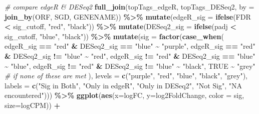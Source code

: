 \documentclass[
]{book}
\newenvironment{Shaded}{\begin{snugshade}}{\end{snugshade}}
\newcommand{\AttributeTok}[1]{\textcolor[rgb]{0.13,0.29,0.53}{#1}}
\newcommand{\CommentTok}[1]{\textcolor[rgb]{0.56,0.35,0.01}{\textit{#1}}}
\newcommand{\ConstantTok}[1]{\textcolor[rgb]{0.56,0.35,0.01}{#1}}
\newcommand{\FunctionTok}[1]{\textcolor[rgb]{0.13,0.29,0.53}{\textbf{#1}}}
\newcommand{\NormalTok}[1]{#1}
\newcommand{\SpecialCharTok}[1]{\textcolor[rgb]{0.81,0.36,0.00}{\textbf{#1}}}
\newcommand{\StringTok}[1]{\textcolor[rgb]{0.31,0.60,0.02}{#1}}
\begin{document}
\begin{Shaded}
\begin{Highlighting}[]
\CommentTok{\# compare edgeR \& DESeq2}
\FunctionTok{full\_join}\NormalTok{(topTags\_edgeR, topTags\_DESeq2,}
          \AttributeTok{by =} \FunctionTok{join\_by}\NormalTok{(ORF, SGD, GENENAME)) }\SpecialCharTok{\%\textgreater{}\%}
  \FunctionTok{mutate}\NormalTok{(}\AttributeTok{edgeR\_sig =} \FunctionTok{ifelse}\NormalTok{(FDR }\SpecialCharTok{\textless{}}\NormalTok{ sig\_cutoff, }\StringTok{"red"}\NormalTok{, }\StringTok{"black"}\NormalTok{)) }\SpecialCharTok{\%\textgreater{}\%}
  \FunctionTok{mutate}\NormalTok{(}\AttributeTok{DESeq2\_sig =} \FunctionTok{ifelse}\NormalTok{(padj }\SpecialCharTok{\textless{}}\NormalTok{ sig\_cutoff, }\StringTok{"blue"}\NormalTok{, }\StringTok{"black"}\NormalTok{)) }\SpecialCharTok{\%\textgreater{}\%} 
  \FunctionTok{mutate}\NormalTok{(}\AttributeTok{sig =} \FunctionTok{factor}\NormalTok{(}\FunctionTok{case\_when}\NormalTok{(}
\NormalTok{    edgeR\_sig }\SpecialCharTok{==} \StringTok{"red"} \SpecialCharTok{\&}\NormalTok{ DESeq2\_sig }\SpecialCharTok{==} \StringTok{"blue"} \SpecialCharTok{\textasciitilde{}} \StringTok{"purple"}\NormalTok{,}
\NormalTok{    edgeR\_sig }\SpecialCharTok{==} \StringTok{"red"} \SpecialCharTok{\&}\NormalTok{ DESeq2\_sig }\SpecialCharTok{!=} \StringTok{"blue"} \SpecialCharTok{\textasciitilde{}} \StringTok{"red"}\NormalTok{,}
\NormalTok{    edgeR\_sig }\SpecialCharTok{!=} \StringTok{"red"} \SpecialCharTok{\&}\NormalTok{ DESeq2\_sig }\SpecialCharTok{==} \StringTok{"blue"} \SpecialCharTok{\textasciitilde{}} \StringTok{"blue"}\NormalTok{,}
\NormalTok{    edgeR\_sig }\SpecialCharTok{!=} \StringTok{"red"} \SpecialCharTok{\&}\NormalTok{ DESeq2\_sig }\SpecialCharTok{!=} \StringTok{"blue"} \SpecialCharTok{\textasciitilde{}} \StringTok{"black"}\NormalTok{,}
    \ConstantTok{TRUE} \SpecialCharTok{\textasciitilde{}} \StringTok{"grey"}  \CommentTok{\# if none of these are met}
\NormalTok{  ), }\AttributeTok{levels =} \FunctionTok{c}\NormalTok{(}\StringTok{"purple"}\NormalTok{, }\StringTok{"red"}\NormalTok{, }\StringTok{"blue"}\NormalTok{, }\StringTok{"black"}\NormalTok{, }\StringTok{"grey"}\NormalTok{), }\AttributeTok{labels =} \FunctionTok{c}\NormalTok{(}\StringTok{"Sig in Both"}\NormalTok{, }\StringTok{"Only in edgeR"}\NormalTok{, }\StringTok{"Only in DESeq2"}\NormalTok{, }\StringTok{"Not Sig"}\NormalTok{, }\StringTok{"NA encountered"}\NormalTok{))) }\SpecialCharTok{\%\textgreater{}\%}
  \FunctionTok{ggplot}\NormalTok{(}\FunctionTok{aes}\NormalTok{(}\AttributeTok{x=}\NormalTok{logFC, }\AttributeTok{y=}\NormalTok{log2FoldChange, }\AttributeTok{color =}\NormalTok{ sig, }\AttributeTok{size=}\NormalTok{logCPM)) }\SpecialCharTok{+}

\end{Highlighting}
\end{Shaded}
\end{document}
